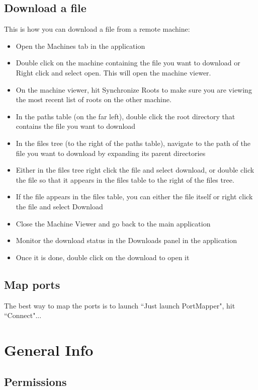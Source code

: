 \documentclass{article}
\begin{document}
\subsection{Download a file}
This is how you can download a file from a remote machine:
\begin{itemize}
  \item Open the Machines tab in the application
  \item Double click on the machine containing the file you want to download or Right click and select open. This will open the machine viewer.
  \item On the machine viewer, hit Synchronize Roots to make sure you are viewing the most recent list of roots on the other machine.
  \item In the paths table (on the far left), double click the root directory that contains the file you want to download
  \item In the files tree (to the right of the paths table), navigate to the path of the file you want to download by expanding its parent directories
  \item Either in the files tree right click the file and select download, or double click the file so that it appears in the files table to the right of the files tree.
  \item If the file appears in the files table, you can either the file itself or right click the file and select Download
  \item Close the Machine Viewer and go back to the main application
  \item Monitor the download status in the Downloads panel in the application
  \item Once it is done, double click on the download to open it
\end{itemize}

\subsection{Map ports}

The best way to map the ports is to launch ``Just launch PortMapper", hit ``Connect"...

\section{General Info}

\subsection{Permissions}
\end{document}
